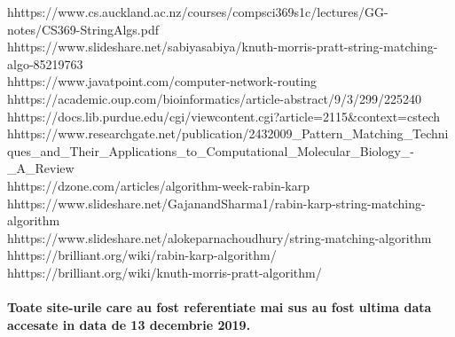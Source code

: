 \documentclass[runningheads]{llncs}
\begin{document}
\pagebreak
\begin{thebibliography}{8}
\bibitem hhttps://www.cs.auckland.ac.nz/courses/compsci369s1c/lectures/GG-notes/CS369-StringAlgs.pdf \\
\bibitem hhttps://www.slideshare.net/sabiyasabiya/knuth-morris-pratt-string-matching-algo-85219763 \\
\bibitem hhttps://www.javatpoint.com/computer-network-routing \\
\bibitem hhttps://academic.oup.com/bioinformatics/article-abstract/9/3/299/225240 \\
\bibitem hhttps://docs.lib.purdue.edu/cgi/viewcontent.cgi?article=2115\&context=cstech \\
\bibitem hhttps://www.researchgate.net/publication/2432009\_Pattern\_Matching\_Techniques\_and\_Their\_Applications\_to\_Computational\_Molecular\_Biology\_-\_A\_Review \\
\bibitem hhttps://dzone.com/articles/algorithm-week-rabin-karp \\
\bibitem hhttps://www.slideshare.net/GajanandSharma1/rabin-karp-string-matching-algorithm \\
\bibitem hhttps://www.slideshare.net/alokeparnachoudhury/string-matching-algorithm \\
\bibitem hhttps://brilliant.org/wiki/rabin-karp-algorithm/ \\
\bibitem hhttps://brilliant.org/wiki/knuth-morris-pratt-algorithm/ \\
\end{thebibliography}
\paragraph{Toate site-urile care au fost referentiate mai sus au fost ultima data accesate in data de 13 decembrie 2019.}
\end{document}

